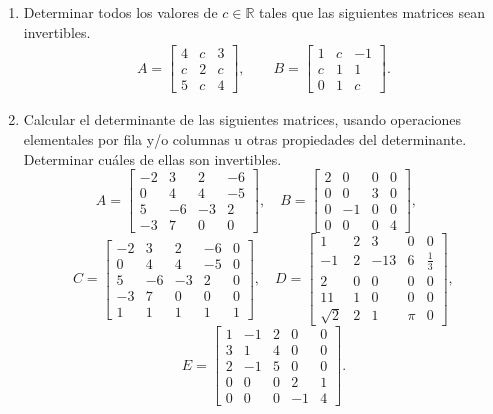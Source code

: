\begin{enumerate}[topsep=6pt,itemsep=.4cm]
\item Determinar todos los valores de $c\in\mathbb{R}$ tales que las siguientes matrices sean invertibles.
\begin{align*}
A=\begin{bmatrix}4& c&3\\c&2&c\\ 5&c&4 \end{bmatrix},\qquad
B=\begin{bmatrix} 1&c&-1\\ c&1&1\\0&1&c\end{bmatrix}.
\end{align*}


\item Calcular el determinante de las siguientes matrices, usando operaciones elementales por fila y/o columnas u otras propiedades del determinante. Determinar cuáles de ellas son invertibles.
\begin{equation*}
A=
\begin{bmatrix}-2&3&2&-6\\ 0&4&4&-5\\ 5&-6&-3&2\\ -3&7&0&0 \end{bmatrix},\quad
B=\begin{bmatrix} 2&0&0&0\\ 0&0&3&0\\ 0&-1&0&0\\ 0&0&0&4\end{bmatrix},\quad
\end{equation*}
\begin{equation*}
    C=\begin{bmatrix} -2&3&2&-6&0\\ 0&4&4&-5&0\\ 5&-6&-3&2&0\\ -3&7&0&0&0\\ 1&1&1&1&1\end{bmatrix},\quad
D=\begin{bmatrix}1&2&3&0&0\\-1&2&-13&6&\frac{1}{3}\\2&0&0&0&0\\11&1&0&0&0\\\sqrt{2}&2&1&\pi&0\end{bmatrix},
\end{equation*}
\begin{equation*}
E=\begin{bmatrix}1&-1&2&0&0\\ 3&1&4&0&0\\ 2&-1&5&0&0 \\0&0&0&2&1\\ 0&0&0&-1&4    \end{bmatrix}.
\end{equation*}


\end{enumerate}
